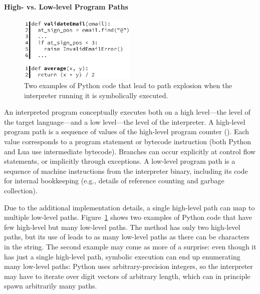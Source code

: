 \paragraph{High- vs. Low-level Program Paths}

\begin{figure}
  \centering
  \includegraphics[width=2.2in]{figures/chef/running-example}
  \caption{Two examples of Python code that lead to path explosion when the interpreter running it is symbolically executed.}
  \label{fig:running-examples}
\end{figure}


An interpreted program conceptually executes both on a high level---the level of the target language---and a low level---the level of the interpreter.
%
A high-level program path is a sequence of values of the high-level program counter (\hlpc). Each \hlpc value corresponds to a program statement or bytecode instruction (both Python and Lua use intermediate bytecode).  Branches can occur explicitly at control flow statements, or implicitly through exceptions.
%
A low-level program path is a sequence of machine instructions from the interpreter binary, including its code for internal bookkeeping (e.g., details of reference counting and garbage collection).

Due to the additional implementation details, a single high-level path can map to multiple low-level paths.
%
Figure~\ref{fig:running-examples} shows two examples of Python code that have few high-level but many low-level paths. The  method has only two high-level paths, but its use of  leads to as many low-level paths as there can be characters in the  string.
%
The second example  may come as more of a surprise: even though it has just a single high-level path, symbolic execution can end up enumerating many low-level paths: Python uses arbitrary-precision integers, so the interpreter may have to iterate over digit vectors of arbitrary length, which can in principle spawn arbitrarily many paths.


